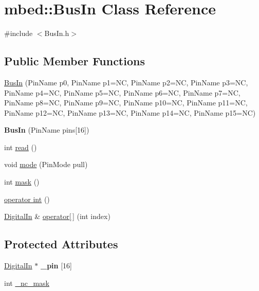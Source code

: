 \hypertarget{classmbed_1_1_bus_in}{}\section{mbed\+:\+:Bus\+In Class Reference}
\label{classmbed_1_1_bus_in}


{\ttfamily \#include $<$Bus\+In.\+h$>$}

\subsection*{Public Member Functions}
\begin{DoxyCompactItemize}
\item 
\hyperlink{classmbed_1_1_bus_in_a60e8a1d93b93bb565d7f6fafacdf6a4b}{Bus\+In} (Pin\+Name p0, Pin\+Name p1=NC, Pin\+Name p2=NC, Pin\+Name p3=NC, Pin\+Name p4=NC, Pin\+Name p5=NC, Pin\+Name p6=NC, Pin\+Name p7=NC, Pin\+Name p8=NC, Pin\+Name p9=NC, Pin\+Name p10=NC, Pin\+Name p11=NC, Pin\+Name p12=NC, Pin\+Name p13=NC, Pin\+Name p14=NC, Pin\+Name p15=NC)
\item 
{\bfseries Bus\+In} (Pin\+Name pins\mbox{[}16\mbox{]})\hypertarget{classmbed_1_1_bus_in_ae48033f85c46aa99f9693a0b890e65b8}{}\label{classmbed_1_1_bus_in_ae48033f85c46aa99f9693a0b890e65b8}

\item 
int \hyperlink{classmbed_1_1_bus_in_aad43475895a43bca659aef8a81dc4478}{read} ()
\item 
void \hyperlink{classmbed_1_1_bus_in_a93eed47467fec29854399cb7606a123b}{mode} (Pin\+Mode pull)
\item 
int \hyperlink{classmbed_1_1_bus_in_a22dfbea3293e2acda246d88d3545f346}{mask} ()
\item 
\hyperlink{classmbed_1_1_bus_in_adb47444fdd5d8928923b39edaa247963}{operator int} ()
\item 
\hyperlink{classmbed_1_1_digital_in}{Digital\+In} \& \hyperlink{classmbed_1_1_bus_in_aa967bad9cca45f21e55385c2ba413236}{operator\mbox{[}$\,$\mbox{]}} (int index)
\end{DoxyCompactItemize}
\subsection*{Protected Attributes}
\begin{DoxyCompactItemize}
\item 
\hyperlink{classmbed_1_1_digital_in}{Digital\+In} $\ast$ {\bfseries \+\_\+pin} \mbox{[}16\mbox{]}\hypertarget{classmbed_1_1_bus_in_a44b9ec611a79d62de2be00c04ee034a1}{}\label{classmbed_1_1_bus_in_a44b9ec611a79d62de2be00c04ee034a1}

\item 
int \hyperlink{classmbed_1_1_bus_in_a3ccecbfabfbc7bcf74034264be551c3e}{\+\_\+nc\+\_\+mask}
\end{DoxyCompactItemize}


